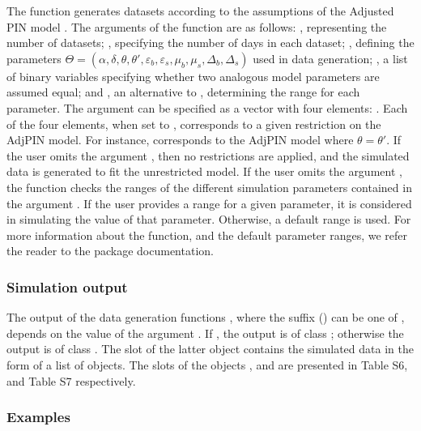 The function  generates datasets according to the assumptions of the Adjusted PIN model \citep{duarte2009why}. The arguments of the function are as follows: , representing the number of datasets; , specifying the number of days in each dataset; , defining the parameters \(\Theta = (\alpha ,\delta ,\theta ,\theta',\varepsilon_{b},\varepsilon_{s}, \mu_{b},\mu_{s},\Delta_{b},\Delta_{s})\) used in data generation; , a list of binary variables specifying whether two analogous model parameters are assumed equal; and , an alternative to , determining the range for each parameter. The argument  can be specified as a vector with four elements: . Each of the four elements, when set to , corresponds to a given restriction on the AdjPIN model. For instance,  corresponds to the AdjPIN model where \(\theta = \theta'\). If the user omits the argument , then no restrictions are applied, and the simulated data is generated to fit the unrestricted model. If the user omits the argument , the function checks the ranges of the different simulation parameters contained in the argument . If the user provides a range for a given parameter, it is considered in simulating the value of that parameter. Otherwise, a default range is used. For more information about the function, and the default parameter ranges, we refer the reader to the package documentation.

\subsubsection{Simulation output}

The output of the data generation functions , where the suffix (\code{*}) can be one of , depends on the value of the argument . If , the output is of class ; otherwise the output is of class . The slot  of the latter object contains the simulated data in the form of a list of  objects. The slots of the objects , and  are presented in Table S6, and Table S7 respectively.

\subsubsection{Examples}

